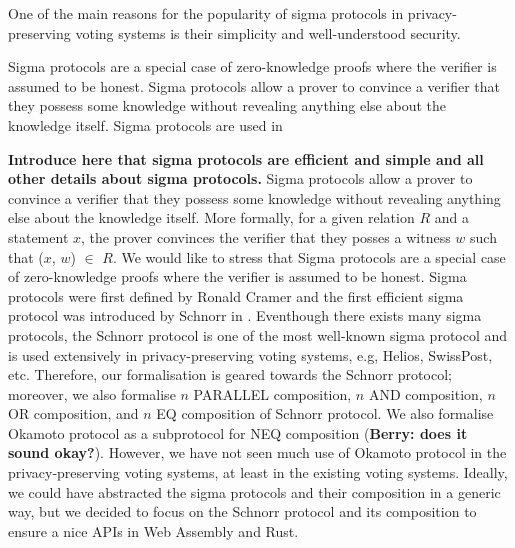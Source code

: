 \documentclass[sigconf]{acmart}
\begin{document}
One of the main reasons for the popularity of sigma protocols in 
privacy-preserving voting systems is their simplicity and well-understood
security. 
 
Sigma protocols are a special case of
zero-knowledge proofs where the verifier is assumed to be honest. Sigma protocols
allow a prover to convince a verifier that they possess some knowledge without
revealing anything else about the knowledge itself. Sigma protocols are used in

\textbf{Introduce here that sigma protocols are efficient and simple and all 
other details about sigma protocols.} Sigma protocols allow a prover to convince a verifier that 
they possess some knowledge without revealing anything else about the knowledge itself.  
More formally, for a given relation $R$ and a statement $x$, the prover convinces the verifier
that they posses a witness $w$ such that ($x$, $w$) $\in$ $R$. We would like to stress that
Sigma protocols are a special case of zero-knowledge proofs where the verifier is 
assumed to be honest. Sigma protocols were first defined by Ronald Cramer \cite{cramer1996modular} and the 
first efficient sigma protocol was introduced by Schnorr in \cite{schnorr1991efficient}. 
Eventhough there exists many sigma protocols, the Schnorr protocol is one of the most well-known
sigma protocol and is used extensively in privacy-preserving voting systems, e.g, Helios, SwissPost, etc. 
Therefore, our formalisation is geared towards the Schnorr protocol; moreover, we 
also formalise $n$ PARALLEL composition, $n$ AND composition, $n$ OR composition, 
and $n$ EQ composition of Schnorr protocol. We also formalise Okamoto protocol as a subprotocol 
for NEQ composition (\textbf{Berry: does it sound okay?}). However, we have not seen 
much use of Okamoto protocol in the privacy-preserving voting systems, 
at least in the existing voting systems. Ideally, we could have abstracted the sigma protocols and their composition in a generic way,
but we decided to focus on the Schnorr protocol and its composition to ensure a nice APIs in 
Web Assembly and Rust.
\end{document}
